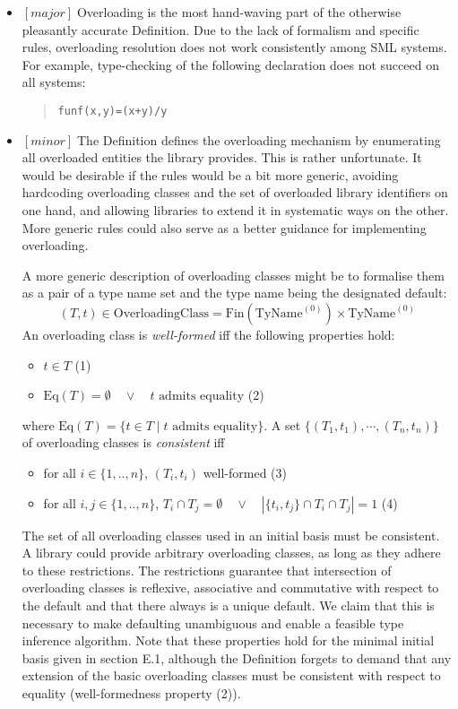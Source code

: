 \documentclass{article}
\newcommand{\m}[1]{$[\mathit{#1}]\;$}
\newcommand{\major}{\m{major}}
\newcommand{\minor}{\m{minor}}
\begin{document}
\begin{itemize}
\item \major Overloading is the most hand-waving part of the otherwise pleasantly accurate Definition. Due to the lack of formalism and specific rules, overloading resolution does not work consistently among SML systems. For example, type-checking of the following declaration does not succeed on all systems:
\begin{quote}
\begin{alltt}
fun f(x,y) = (x + y)/y
\end{alltt}
\end{quote}
\item \minor The Definition defines the overloading mechanism by enumerating all overloaded entities the library provides. This is rather unfortunate. It would be desirable if the rules would be a bit more generic, avoiding hardcoding overloading classes and the set of overloaded library identifiers on one hand, and allowing libraries to extend it in systematic ways on the other. More generic rules could also serve as a better guidance for implementing overloading.

A more generic description of overloading classes might be to formalise them as a pair of a type name set and the type name being the designated default:
\begin{displaymath}
(T,t) \in \mbox{OverloadingClass} = \mbox{Fin}(\mbox{TyName}^{(0)}) \times \mbox{TyName}^{(0)}
\end{displaymath}
An overloading class is {\em well-formed} iff the following properties hold:
\begin{itemize}
\item[] $t \in T$ \hfill (1)
\item[] $\mbox{Eq}(T) = \emptyset \quad\vee\quad \mbox{$t$ admits equality}$ \hfill (2)
\end{itemize}
where $\mbox{Eq}(T) = \{ t \in T \;|\; \mbox{$t$ admits equality} \}$. A set $\{(T_1,t_1),\cdots,(T_n,t_n)\}$ of overloading classes is {\em consistent} iff
\begin{itemize}
\item[] for all $i\in\{1,..,n\}$, \quad $(T_i,t_i)$ well-formed \hfill (3)
\item[] for all $i,j\in\{1,..,n\}$, \quad $T_i \cap T_j = \emptyset \quad\vee\quad |\{t_i,t_j\} \cap T_i \cap T_j| = 1$  \hfill (4)
\end{itemize}

The set of all overloading classes used in an initial basis must be consistent. A library could provide arbitrary overloading classes, as long as they adhere to these restrictions. The restrictions guarantee that intersection of overloading classes is reflexive, associative and commutative with respect to the default and that there always is a unique default. We claim that this is necessary to make defaulting unambiguous and enable a feasible type inference algorithm. Note that these properties hold for the minimal initial basis given in section E.1, although the Definition forgets to demand that any extension of the basic overloading classes must be consistent with respect to equality (well-formedness property (2)).


\end{itemize}
\end{document}
